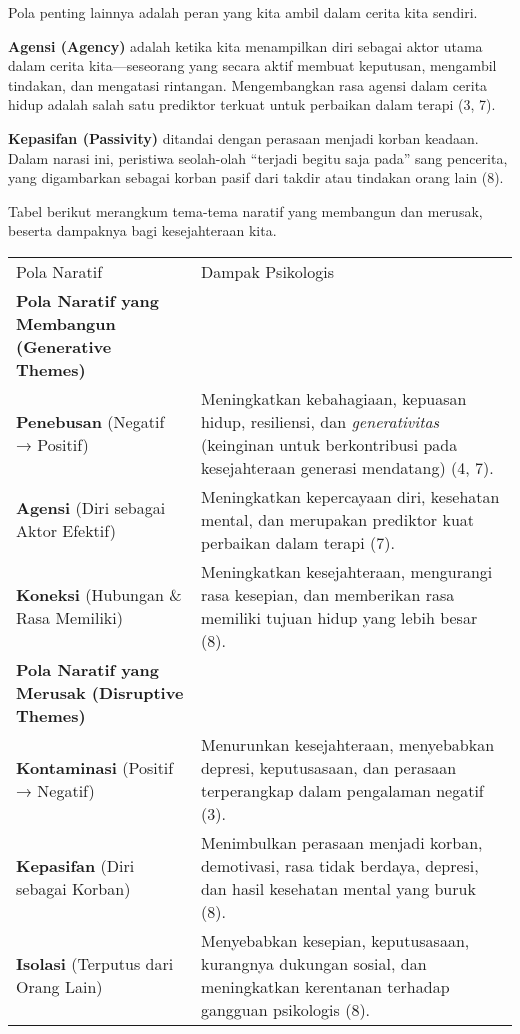 \documentclass[
  letterpaper,
  DIV=11,
  numbers=noendperiod]{scrreprt}
\begin{document}
Pola penting lainnya adalah peran yang kita ambil dalam cerita kita
sendiri.

\textbf{Agensi (Agency)} adalah ketika kita menampilkan diri sebagai
aktor utama dalam cerita kita---seseorang yang secara aktif membuat
keputusan, mengambil tindakan, dan mengatasi rintangan. Mengembangkan
rasa agensi dalam cerita hidup adalah salah satu prediktor terkuat untuk
perbaikan dalam terapi (3, 7).

\textbf{Kepasifan (Passivity)} ditandai dengan perasaan menjadi korban
keadaan. Dalam narasi ini, peristiwa seolah-olah ``terjadi begitu saja
pada'' sang pencerita, yang digambarkan sebagai korban pasif dari takdir
atau tindakan orang lain (8).

Tabel berikut merangkum tema-tema naratif yang membangun dan merusak,
beserta dampaknya bagi kesejahteraan kita.

\begin{longtable}[]{@{}
  >{\raggedright\arraybackslash}p{}
  >{\raggedright\arraybackslash}p{}@{}}
\toprule\noalign{}
\endhead
\bottomrule\noalign{}
\endlastfoot
Pola Naratif & Dampak Psikologis \\
\textbf{Pola Naratif yang Membangun (Generative Themes)} & \\
\textbf{Penebusan} (Negatif → Positif) & Meningkatkan kebahagiaan,
kepuasan hidup, resiliensi, dan \emph{generativitas} (keinginan untuk
berkontribusi pada kesejahteraan generasi mendatang) (4, 7). \\
\textbf{Agensi} (Diri sebagai Aktor Efektif) & Meningkatkan kepercayaan
diri, kesehatan mental, dan merupakan prediktor kuat perbaikan dalam
terapi (7). \\
\textbf{Koneksi} (Hubungan \& Rasa Memiliki) & Meningkatkan
kesejahteraan, mengurangi rasa kesepian, dan memberikan rasa memiliki
tujuan hidup yang lebih besar (8). \\
\textbf{Pola Naratif yang Merusak (Disruptive Themes)} & \\
\textbf{Kontaminasi} (Positif → Negatif) & Menurunkan kesejahteraan,
menyebabkan depresi, keputusasaan, dan perasaan terperangkap dalam
pengalaman negatif (3). \\
\textbf{Kepasifan} (Diri sebagai Korban) & Menimbulkan perasaan menjadi
korban, demotivasi, rasa tidak berdaya, depresi, dan hasil kesehatan
mental yang buruk (8). \\
\textbf{Isolasi} (Terputus dari Orang Lain) & Menyebabkan kesepian,
keputusasaan, kurangnya dukungan sosial, dan meningkatkan kerentanan
terhadap gangguan psikologis (8). \\
\end{longtable}
\end{document}
